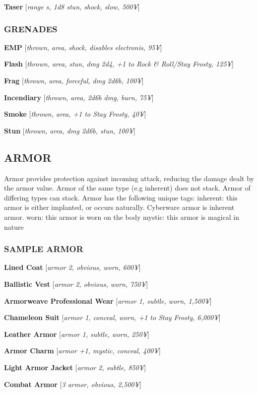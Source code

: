 \documentclass[oneside,10pt]{article}
\begin{document}
\begin{multicols}{2}
\textbf{Taser} [\textit{range s, 1d8 stun, shock,
  slow, 500¥}]


\subsubsection{GRENADES}
\textbf{EMP} [\textit{thrown, area, shock,
  disables electronis, 95¥}]

\textbf{Flash} [\textit{thrown, area, stun, dmg 2d4, +1 to Rock \& Roll/Stay
Frosty, 125¥}]

\textbf{Frag} [\textit{thrown, area, forceful, dmg
  2d6b, 100¥}]

\textbf{Incendiary} [\textit{thrown, area, 2d6b
  dmg, burn, 75¥}]

\textbf{Smoke} [\textit{thrown, area, +1 to Stay
  Frosty, 40¥}]

\textbf{Stun} [\textit{thrown, area, dmg 2d6b, stun, 100¥}]

\subsection{ARMOR}
Armor provides protection against incoming attack, reducing
the damage dealt by the armor value. Armor of the same
type (e.g inherent) does not stack. Armor of differing types
can stack. Armor has the following unique tags:
inherent: this armor is either implanted, or occurs naturally.
Cyberware armor is inherent armor.
worn: this armor is worn on the body
mystic: this armor is magical in nature

\subsubsection{SAMPLE ARMOR}
\textbf{Lined Coat} [\textit{armor 2, obvious,
  worn, 600¥}]


\textbf{Ballistic Vest} [\textit{armor 2, obvious,
  worn, 750¥}]

\textbf{Armorweave Professional Wear} [\textit{armor 1, subtle, worn,
1,500¥}]

\textbf{Chameleon Suit} [\textit{armor 1, conceal, worn, +1 to Stay Frosty, 6,000¥}]

\textbf{Leather Armor} [\textit{armor 1, subtle,
  worn, 250¥}]

\textbf{Armor Charm} [\textit{armor +1, mystic,
  conceal, 400¥}]

\textbf{Light Armor Jacket} [\textit{armor 2,
  subtle, 850¥}]

\textbf{Combat Armor} [\textit{3 armor, obvious,
  2,500¥}]


\end{multicols}
\end{document}
